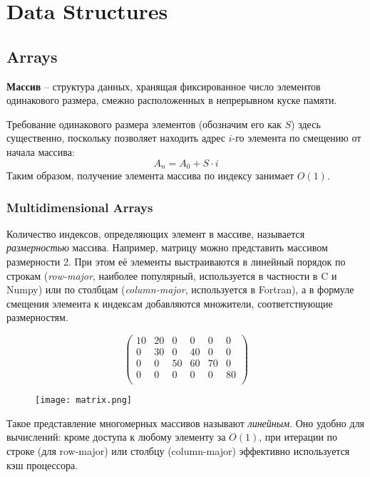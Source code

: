 
\chapter{Data Structures}

\section{Arrays}

{\bf Массив} -- структура данных, хранящая фиксированное число элементов одинакового размера, смежно расположенных в непрерывном куске памяти.

Требование одинакового размера элементов (обозначим его как $S$) здесь существенно, поскольку позволяет находить адрес $i$-го элемента по смещению от начала массива:
$$A_n = A_0 + S \cdot i$$
Таким образом, получение элемента массива по индексу занимает $O(1)$. 

\subsection*{Multidimensional Arrays}

Количество индексов, определяющих элемент в массиве, называется {\em размерностью} массива. Например, матрицу можно представить массивом размерности 2. При этом её элементы выстраиваются в линейный порядок по строкам ({\em row-major}, наиболее популярный, используется в частности в C и Numpy) или по столбцам ({\em column-major}, используется в Fortran), а в формуле смещения элемента к индексам добавляются множители, соответствующие размерностям.

$$
\begin{pmatrix}
10 & 20 &  0 &  0 &  0 &  0 \\
 0 & 30 &  0 & 40 &  0 &  0 \\
 0 &  0 & 50 & 60 & 70 &  0 \\
 0 &  0 &  0 &  0 &  0 & 80 \\
\end{pmatrix}
$$

\begin{figure}[!ht]
\centering
\texttt{[image: matrix.png]}
\end{figure}

Такое представление многомерных массивов называют {\em линейным}. Оно удобно для вычислений: кроме доступа к любому элементу за $O(1)$, при итерации по строке (для row-major) или столбцу (column-major) эффективно используется кэш процессора.

